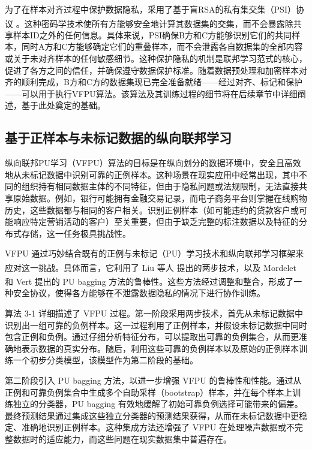 为了在样本对齐过程中保护数据隐私，采用了基于盲RSA的私有集交集（PSI）协议 \textsuperscript{\cite{de2010practical}}。这种密码学技术使所有方能够安全地计算其数据集的交集，而不会暴露除共享样本ID之外的任何信息。具体来说，PSI确保B方和C方能够识别它们的共同样本，同时A方和C方能够确定它们的重叠样本，而不会泄露各自数据集的全部内容或关于未对齐样本的任何敏感细节。这种保护隐私的机制是联邦学习范式的核心，促进了各方之间的信任，并确保遵守数据保护标准。随着数据预处理和加密样本对齐的顺利完成，B方和C方的数据集现已完全准备就绪——经过对齐、标记和保护——可以用于执行VFPU算法。该算法及其训练过程的细节将在后续章节中详细阐述，基于此处奠定的基础。


\subsection{基于正样本与未标记数据的纵向联邦学习}
纵向联邦PU学习（VFPU）算法的目标是在纵向划分的数据环境中，安全且高效地从未标记数据中识别可靠的正例样本。这种场景在现实应用中经常出现，其中不同的组织持有相同数据主体的不同特征，但由于隐私问题或法规限制，无法直接共享原始数据。例如，银行可能拥有金融交易记录，而电子商务平台则掌握在线购物历史，这些数据都与相同的客户相关。识别正例样本（如可能违约的贷款客户或可能响应特定营销活动的客户）至关重要，但由于缺乏完整的标注数据以及特征的分布式存储，这一任务极具挑战性。

VFPU 通过巧妙结合既有的正例与未标记（PU）学习技术和纵向联邦学习框架来应对这一挑战。具体而言，它利用了 Liu 等人 \textsuperscript{\cite{liu2003building}} 提出的两步技术，以及 Mordelet 和 Vert \textsuperscript{\cite{mordelet2014bagging}} 提出的 PU bagging 方法的鲁棒性。这些方法经过调整和整合，形成了一种安全协议，使得各方能够在不泄露数据隐私的情况下进行协作训练。

算法 3-1 详细描述了 VFPU 过程。第一阶段采用两步技术，首先从未标记数据中识别出一组可靠的负例样本。这一过程利用了正例样本，并假设未标记数据中同时包含正例和负例。通过仔细分析特征分布，可以提取出可靠的负例集合，从而更准确地表示数据的真实分布。随后，利用这些可靠的负例样本以及原始的正例样本训练一个初步分类模型，该模型作为第二阶段的基础。


第二阶段引入 PU bagging 方法，以进一步增强 VFPU 的鲁棒性和性能。通过从正例和可靠负例集合中生成多个自助采样（bootstrap）样本，并在每个样本上训练独立的分类器，PU bagging 有效地缓解了初始可靠负例选择可能带来的偏差。最终预测结果通过集成这些独立分类器的预测结果获得，从而在未标记数据中更稳定、准确地识别正例样本。这种集成方法还增强了 VFPU 在处理噪声数据或不完整数据时的适应能力，而这些问题在现实数据集中普遍存在。

